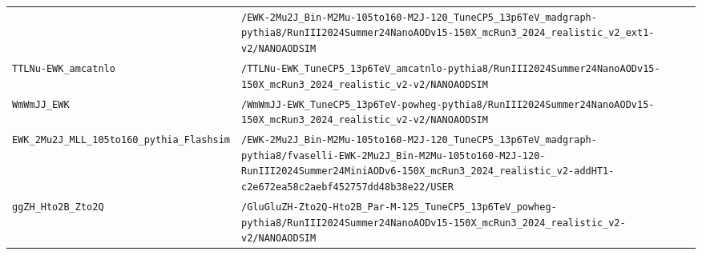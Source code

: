 \begin{longtable}{@{}>{\RaggedRight\arraybackslash}p{} >{\RaggedRight\arraybackslash}p{}@{}}
 & \texttt{/\allowbreak{}EWK-\allowbreak{}2Mu2J\_\allowbreak{}Bin-\allowbreak{}M2Mu-\allowbreak{}105to160-\allowbreak{}M2J-\allowbreak{}120\_\allowbreak{}TuneCP5\_\allowbreak{}13p6TeV\_\allowbreak{}madgraph-\allowbreak{}pythia8/\allowbreak{}RunIII2024Summer24NanoAODv15-\allowbreak{}150X\_\allowbreak{}mcRun3\_\allowbreak{}2024\_\allowbreak{}realistic\_\allowbreak{}v2\_\allowbreak{}ext1-\allowbreak{}v2/\allowbreak{}NANOAODSIM} \\
\addlinespace[2pt]
\texttt{TTLNu-\allowbreak{}EWK\_\allowbreak{}amcatnlo} & \texttt{/\allowbreak{}TTLNu-\allowbreak{}EWK\_\allowbreak{}TuneCP5\_\allowbreak{}13p6TeV\_\allowbreak{}amcatnlo-\allowbreak{}pythia8/\allowbreak{}RunIII2024Summer24NanoAODv15-\allowbreak{}150X\_\allowbreak{}mcRun3\_\allowbreak{}2024\_\allowbreak{}realistic\_\allowbreak{}v2-\allowbreak{}v2/\allowbreak{}NANOAODSIM} \\
\addlinespace[2pt]
\texttt{WmWmJJ\_\allowbreak{}EWK} & \texttt{/\allowbreak{}WmWmJJ-\allowbreak{}EWK\_\allowbreak{}TuneCP5\_\allowbreak{}13p6TeV-\allowbreak{}powheg-\allowbreak{}pythia8/\allowbreak{}RunIII2024Summer24NanoAODv15-\allowbreak{}150X\_\allowbreak{}mcRun3\_\allowbreak{}2024\_\allowbreak{}realistic\_\allowbreak{}v2-\allowbreak{}v2/\allowbreak{}NANOAODSIM} \\
\addlinespace[2pt]
\texttt{EWK\_\allowbreak{}2Mu2J\_\allowbreak{}MLL\_\allowbreak{}105to160\_\allowbreak{}pythia\_\allowbreak{}Flashsim} & \texttt{/\allowbreak{}EWK-\allowbreak{}2Mu2J\_\allowbreak{}Bin-\allowbreak{}M2Mu-\allowbreak{}105to160-\allowbreak{}M2J-\allowbreak{}120\_\allowbreak{}TuneCP5\_\allowbreak{}13p6TeV\_\allowbreak{}madgraph-\allowbreak{}pythia8/\allowbreak{}fvaselli-\allowbreak{}EWK-\allowbreak{}2Mu2J\_\allowbreak{}Bin-\allowbreak{}M2Mu-\allowbreak{}105to160-\allowbreak{}M2J-\allowbreak{}120-\allowbreak{}RunIII2024Summer24MiniAODv6-\allowbreak{}150X\_\allowbreak{}mcRun3\_\allowbreak{}2024\_\allowbreak{}realistic\_\allowbreak{}v2-\allowbreak{}addHT1-\allowbreak{}c2e672ea58c2aebf452757dd48b38e22/\allowbreak{}USER} \\
\addlinespace[2pt]
\texttt{ggZH\_\allowbreak{}Hto2B\_\allowbreak{}Zto2Q} & \texttt{/\allowbreak{}GluGluZH-\allowbreak{}Zto2Q-\allowbreak{}Hto2B\_\allowbreak{}Par-\allowbreak{}M-\allowbreak{}125\_\allowbreak{}TuneCP5\_\allowbreak{}13p6TeV\_\allowbreak{}powheg-\allowbreak{}pythia8/\allowbreak{}RunIII2024Summer24NanoAODv15-\allowbreak{}150X\_\allowbreak{}mcRun3\_\allowbreak{}2024\_\allowbreak{}realistic\_\allowbreak{}v2-\allowbreak{}v2/\allowbreak{}NANOAODSIM} \\

\end{longtable}
